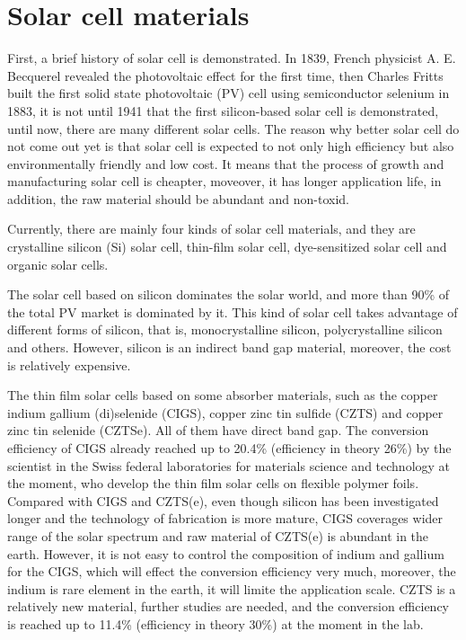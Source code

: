 \documentclass[a4paper, 12pt, titlepage,oneside,drop]{kthesis}
\begin{document}
\section{Solar cell materials}
First, a brief history of solar cell is demonstrated. In 1839,  French physicist A. E. Becquerel revealed the photovoltaic effect for the first time, then Charles Fritts built the first solid state photovoltaic (PV) cell using semiconductor selenium in 1883,
it is not until 1941 that the first silicon-based solar cell is demonstrated, until now, there are many different solar cells. The reason why 
better solar cell do not come out yet is that solar cell is expected to not only high efficiency but also environmentally friendly and 
low cost. It means that the process of growth and manufacturing solar cell is cheapter, moveover, it has longer application life, in addition,
the raw material should be abundant and non-toxid.




Currently, there are mainly four kinds of solar cell materials, and they are crystalline silicon (Si) solar cell, thin-film solar cell, dye-sensitized solar cell and organic solar cells.

The solar cell based on silicon dominates the solar world, and more than 90\% of the total PV market is dominated by it.
This kind of solar cell takes advantage of different forms of silicon, that is, monocrystalline silicon, polycrystalline silicon and others. However, silicon is
an indirect band gap material, moreover, the cost is relatively expensive.

 


The thin film solar cells based on some absorber materials, such as the copper indium gallium (di)selenide (CIGS), copper zinc tin sulfide (CZTS) and copper zinc tin
selenide (CZTSe). All of them have direct band gap. The conversion efficiency of CIGS already reached
up to 20.4\% (efficiency in theory 26\%) by the scientist in the Swiss federal laboratories for materials science and technology at the moment, who develop the thin film solar cells on flexible
polymer foils. Compared with CIGS and CZTS(e), even though silicon has been investigated longer and the technology of fabrication is more mature,
CIGS coverages wider range of the solar spectrum and raw material of CZTS(e) is abundant in the earth. However, it is not easy to control the composition of indium and gallium for the CIGS, 
which will effect the conversion efficiency very much, moreover, the indium is rare element in the earth, it will limite the application scale. CZTS is 
a relatively new material, further studies are needed, and the conversion efficiency is reached up to 11.4\% (efficiency in theory 30\%) at the moment in the lab.
\end{document}

